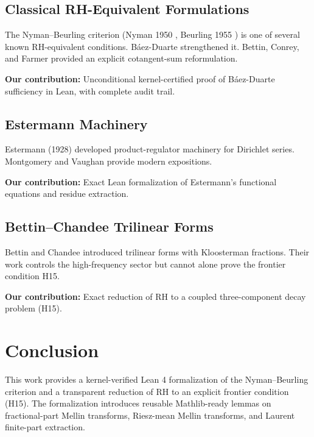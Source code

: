 \documentclass[11pt,a4paper]{article}
\theoremstyle{plain}
\theoremstyle{definition}
\theoremstyle{remark}
\begin{document}
\subsection{Classical RH-Equivalent Formulations}

The Nyman--Beurling criterion (Nyman 1950 \cite{Nyman1950}, Beurling 1955 \cite{Beurling1955}) is one of several known RH-equivalent conditions. Báez-Duarte \cite{BaezDuarte2003} strengthened it. Bettin, Conrey, and Farmer \cite{BettinConreyFarmer2020} provided an explicit cotangent-sum reformulation.

\textbf{Our contribution:} Unconditional kernel-certified proof of Báez-Duarte sufficiency in Lean, with complete audit trail.

\subsection{Estermann Machinery}

Estermann (1928) \cite{Estermann1928} developed product-regulator machinery for Dirichlet series. Montgomery and Vaughan \cite{MontgomeryVaughan2007} provide modern expositions.

\textbf{Our contribution:} Exact Lean formalization of Estermann's functional equations and residue extraction.

\subsection{Bettin--Chandee Trilinear Forms}

Bettin and Chandee \cite{BettinChandee2015} introduced trilinear forms with Kloosterman fractions. Their work controls the high-frequency sector but cannot alone prove the frontier condition H15.

\textbf{Our contribution:} Exact reduction of RH to a coupled three-component decay problem (H15).

\section{Conclusion}
\label{sec:conclusion}

This work provides a kernel-verified Lean 4 formalization of the Nyman--Beurling criterion and a transparent reduction of RH to an explicit frontier condition (H15). The formalization introduces reusable Mathlib-ready lemmas on fractional-part Mellin transforms, Riesz-mean Mellin transforms, and Laurent finite-part extraction.
\end{document}
